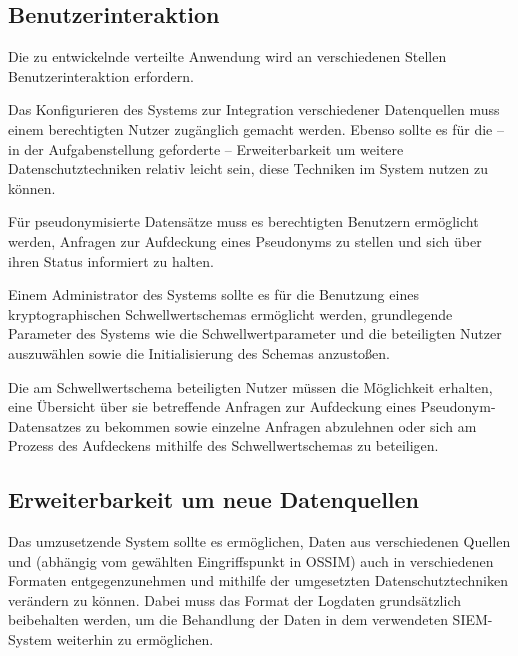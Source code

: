 \subsection{Benutzerinteraktion}

\label{subsec_impl_requirements_userinteraction}




Die zu entwickelnde verteilte Anwendung wird an verschiedenen Stellen Benutzerinteraktion erfordern.

Das Konfigurieren des Systems zur Integration verschiedener Datenquellen muss einem berechtigten Nutzer zugänglich gemacht werden. Ebenso sollte es für die -- in der Aufgabenstellung geforderte -- Erweiterbarkeit um weitere Datenschutztechniken relativ leicht sein, diese Techniken im System nutzen zu können. 

Für pseudonymisierte Datensätze muss es berechtigten Benutzern ermöglicht werden, Anfragen zur Aufdeckung eines Pseudonyms zu stellen und sich über ihren Status informiert zu halten.

Einem Administrator des Systems sollte es für die Benutzung eines kryptographischen Schwellwertschemas ermöglicht werden, grundlegende Parameter des Systems wie die Schwellwertparameter und die beteiligten Nutzer auszuwählen sowie die Initialisierung des Schemas anzustoßen. 

Die am Schwellwertschema beteiligten Nutzer müssen die Möglichkeit erhalten, eine Übersicht über sie betreffende Anfragen zur Aufdeckung eines Pseudonym-Datensatzes zu bekommen sowie einzelne Anfragen abzulehnen oder sich am Prozess des Aufdeckens mithilfe des Schwellwertschemas zu beteiligen. 

\subsection{Erweiterbarkeit um neue Datenquellen}

\label{subsec_impl_requirements_differentsources}

Das umzusetzende System sollte es ermöglichen, Daten aus verschiedenen Quellen und (abhängig vom gewählten Eingriffspunkt in OSSIM) auch in verschiedenen Formaten entgegenzunehmen und mithilfe der umgesetzten Datenschutztechniken verändern zu können. Dabei muss das Format der Logdaten grundsätzlich beibehalten werden, um die Behandlung der Daten in dem verwendeten SIEM-System weiterhin zu ermöglichen.

